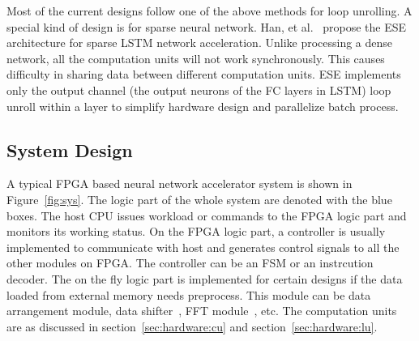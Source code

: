 Most of the current designs follow one of the above methods for loop unrolling. A special kind of design is for sparse neural network. Han, et al.~\cite{han2017ese} propose the ESE architecture for sparse LSTM network acceleration. Unlike processing a dense network, all the computation units will not work synchronously. This causes difficulty in sharing data between different computation units. ESE implements only the output channel (the output neurons of the FC layers in LSTM) loop unroll within a layer to simplify hardware design and parallelize batch process.

\subsection{System Design}\label{sec:hardware:sys}

A typical FPGA based neural network accelerator system is shown in Figure~\ref{fig:sys}. The logic part of the whole system are denoted with the blue boxes. The host CPU issues workload or commands to the FPGA logic part and monitors its working status. On the FPGA logic part, a controller is usually implemented to communicate with host and generates control signals to all the other modules on FPGA. The controller can be an FSM or an instrcution decoder. The on the fly logic part is implemented for certain designs if the data loaded from external memory needs preprocess. This module can be data arrangement module, data shifter~\cite{qiu2016going}, FFT module~\cite{zhang2017frequency}, etc. The computation units are as discussed in section~\ref{sec:hardware:cu} and section~\ref{sec:hardware:lu}.

